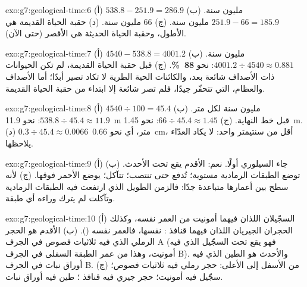 \begin{solution}{exo:g7:geological-time:6}
(أ) $538.8 - 251.9 = 286.9$ مليون سنة. (ب) $251.9 - 66 = 185.9$
مليون سنة. (ج) 66 مليون سنة. (د) حقبة الحياة القديمة هي الأطول، وحقبة
الحياة الحديثة هي الأقصر (حتى الآن).
\end{solution}

\begin{solution}{exo:g7:geological-time:7}
(أ) $4540 - 538.8 = 4001.2$ مليون سنة. (ب) $4001.2 \div 4540
\approx 0.881$: نحو \textbf{88~\%}. (ج) قبل حقبة الحياة القديمة، لم تكن
الحيوانات ذات الأصداف شائعة بعد، والكائنات الحية الطرية لا تكاد تصير
 أبدًا؛ أما الأصداف والعظام، التي تتحفّر جيدًا، فلم تصر شائعة إلا
ابتداء من حقبة الحياة القديمة.
\end{solution}

\begin{solution}{exo:g7:geological-time:8}
(أ) $4540 \div 100 = 45.4$ مليون سنة لكل متر. (ب) $538.8 \div 45.4
\approx 11.9$: نحو \qty{11.9}{m} قبل خط النهاية. (ج) $66 \div
45.4 \approx 1.45$: نحو \qty{1.45}{m}. (د) $0.3 \div 45.4 \approx
0.0066$~متر، أي نحو \qty{0.66}{cm}، أقل من سنتيمتر واحد: لا يكاد العدّاء
يلاحظها.
\end{solution}

\begin{solution}{exo:g7:geological-time:9}
(أ) جاء السيلوري أولًا. نعم:  الأقدم يقع تحت الأحدث. (ب) توضع
الطبقات الرمادية مستوية؛ تُدفع حتى تنتصب؛ تتآكل؛ يوضع  الأحمر فوقها.
(ج) لأنه سطح  بين  أعمارها متباعدة جدًا: فالزمن الطويل الذي
ارتفعت فيه الطبقات الرمادية وتآكلت لم يترك وراءه أي طبقة.
\end{solution}

\begin{solution}{exo:g7:geological-time:10}
(أ) السجّيلان اللذان فيهما أمونيت من العمر نفسه، وكذلك الحجران الجيريان
اللذان فيهما قنافذ :  نفسها، فالعمر نفسه (). (ب) الأقدم هو الحجر الرملي الذي فيه ثلاثيات فصوص في الجرف A
(فهو يقع تحت السجّيل الذي فيه أمونيت، وهذا من عمر الطبقة السفلى في الجرف
B). والأحدث هو الطين الذي فيه أوراق نبات في الجرف B. (ج) من الأسفل إلى
الأعلى: حجر رملي فيه ثلاثيات فصوص؛ سجّيل فيه أمونيت؛ حجر جيري فيه قنافذ
؛ طين فيه أوراق نبات.
\end{solution}

